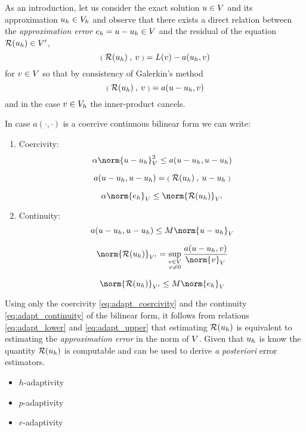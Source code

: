 \medskip
As an introduction, let us consider the exact solution $u\in{V}$ and its approximation ${u_h}\in{{V}}_h$ and observe that there exists a direct relation between the \textit{approximation error} $e_h = u - {u_h} \in{V}$ and the residual of the equation ${\mathcal{R}({u_h})}\in{V}'$,
\[
{{\scriptstyle\mathbf{(}}\;{\mathcal{R}({u_h})}\:,\: v \;{\scriptstyle\mathbf{)}}} = L(v) - a({u_h},  v)
\]
for $v\in{V}$ so that by consistency of Galerkin's method
\[
{{\scriptstyle\mathbf{(}}\;{\mathcal{R}({u_h})}\:,\: v \;{\scriptstyle\mathbf{)}}} = a(u - {u_h},  v)
\]
and in the case $v\in{{V}}_h$ the inner-product cancels.

\medskip
In case $a(\cdot,\cdot)$ is a coercive continuous bilinear form we can write:
\begin{enumerate}
\item Coercivity:
\begin{equation}\label{eq:adapt_coercivity}
\alpha \norm{u - \uh}_{\xV}^2 \leq a(u - \uh,  u - \uh)
\end{equation}


\[
a(u - {u_h},  u - {u_h}) = {{\scriptstyle\mathbf{(}}\;{\mathcal{R}({u_h})}\:,\: u -{u_h} \;{\scriptstyle\mathbf{)}}}
\]

\begin{equation}\label{eq:adapt_lower}
\alpha \norm{e_h}_{\xV} \leq \norm{\Res{\uh}}_{\xV'}
\end{equation}


\item Continuity:
\begin{equation}\label{eq:adapt_continuity}
a(u - \uh,  u - \uh) \leq M \norm{u - \uh}_{\xV}
\end{equation}


\[
\norm{\Res{\uh}}_{\xV'} = \sup_{\substack{v\in\xV\\v\neq 0}} \dfrac{a(u - \uh, v)}{\norm{v}_\xV}
\]

\begin{equation}\label{eq:adapt_upper}
\norm{\Res{\uh}}_{\xV'} \leq M \norm{e_h}_{\xV}
\end{equation}


\end{enumerate}

Using only the coercivity \eqref{eq:adapt_coercivity} and the continuity \eqref{eq:adapt_continuity} of the bilinear form, it follows from relations \eqref{eq:adapt_lower} and \eqref{eq:adapt_upper} that estimating ${\mathcal{R}({u_h})}$ is equivalent to estimating the \textit{approximation error} in the norm of ${V}$.
Given that ${u_h}$ is know the quantity ${\mathcal{R}({u_h})}$ is computable and can be used to derive \textit{a posteriori} error estimators.



\begin{itemize}
\item $h$-adaptivity
\item $p$-adaptivity
\item $r$-adaptivity
\end{itemize}

